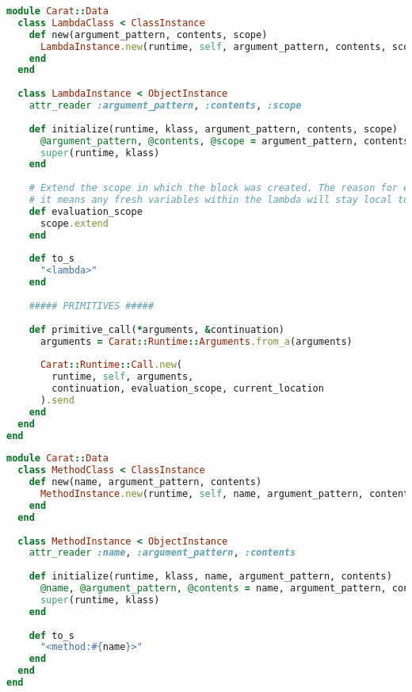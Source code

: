 \begin{lstlisting}[title={\small\ttfamily\bfseries data/lambda.rb},language=Ruby]
module Carat::Data
  class LambdaClass < ClassInstance
    def new(argument_pattern, contents, scope)
      LambdaInstance.new(runtime, self, argument_pattern, contents, scope)
    end
  end
  
  class LambdaInstance < ObjectInstance
    attr_reader :argument_pattern, :contents, :scope
    
    def initialize(runtime, klass, argument_pattern, contents, scope)
      @argument_pattern, @contents, @scope = argument_pattern, contents, scope
      super(runtime, klass)
    end
    
    # Extend the scope in which the block was created. The reason for extending the scope is that 
    # it means any fresh variables within the lambda will stay local to the lambda.
    def evaluation_scope
      scope.extend
    end
    
    def to_s
      "<lambda>"
    end
    
    ##### PRIMITIVES #####
    
    def primitive_call(*arguments, &continuation)
      arguments = Carat::Runtime::Arguments.from_a(arguments)
      
      Carat::Runtime::Call.new(
        runtime, self, arguments,
        continuation, evaluation_scope, current_location
      ).send
    end
  end
end

\end{lstlisting}
\begin{lstlisting}[title={\small\ttfamily\bfseries data/method.rb},language=Ruby]
module Carat::Data
  class MethodClass < ClassInstance
    def new(name, argument_pattern, contents)
      MethodInstance.new(runtime, self, name, argument_pattern, contents)
    end
  end
  
  class MethodInstance < ObjectInstance
    attr_reader :name, :argument_pattern, :contents
    
    def initialize(runtime, klass, name, argument_pattern, contents)
      @name, @argument_pattern, @contents = name, argument_pattern, contents
      super(runtime, klass)
    end
    
    def to_s
      "<method:#{name}>"
    end
  end
end

\end{lstlisting}
